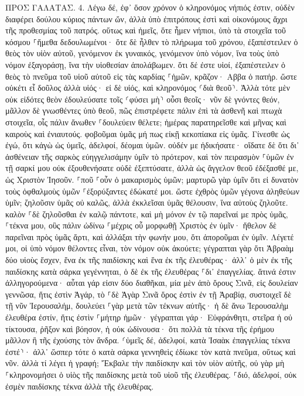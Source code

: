 \documentclass[twoside, 9pt]{extreport}
\begin{document}
ΠΡΟΣ ΓΑΛΑΤΑΣ.
4.
Λέγω δέ, ἐφ᾽ ὅσον χρόνον ὁ κληρονόμος νήπιός ἐστιν, οὐδὲν διαφέρει δούλου κύριος πάντων ὤν, 
ἀλλὰ ὑπὸ ἐπιτρόπους ἐστὶ καὶ οἰκονόμους ἄχρι τῆς προθεσμίας τοῦ πατρός. 
οὕτως καὶ ἡμεῖς, ὅτε ἦμεν νήπιοι, ὑπὸ τὰ στοιχεῖα τοῦ κόσμου ⸀ἤμεθα δεδουλωμένοι· 
ὅτε δὲ ἦλθεν τὸ πλήρωμα τοῦ χρόνου, ἐξαπέστειλεν ὁ θεὸς τὸν υἱὸν αὐτοῦ, γενόμενον ἐκ γυναικός, γενόμενον ὑπὸ νόμον, 
ἵνα τοὺς ὑπὸ νόμον ἐξαγοράσῃ, ἵνα τὴν υἱοθεσίαν ἀπολάβωμεν. 
ὅτι δέ ἐστε υἱοί, ἐξαπέστειλεν ὁ θεὸς τὸ πνεῦμα τοῦ υἱοῦ αὐτοῦ εἰς τὰς καρδίας ⸀ἡμῶν, κρᾶζον· Αββα ὁ πατήρ. 
ὥστε οὐκέτι εἶ δοῦλος ἀλλὰ υἱός· εἰ δὲ υἱός, καὶ κληρονόμος ⸂διὰ θεοῦ⸃. 
Ἀλλὰ τότε μὲν οὐκ εἰδότες θεὸν ἐδουλεύσατε τοῖς ⸂φύσει μὴ⸃ οὖσι θεοῖς· 
νῦν δὲ γνόντες θεόν, μᾶλλον δὲ γνωσθέντες ὑπὸ θεοῦ, πῶς ἐπιστρέφετε πάλιν ἐπὶ τὰ ἀσθενῆ καὶ πτωχὰ στοιχεῖα, οἷς πάλιν ἄνωθεν ⸀δουλεύειν θέλετε; 
ἡμέρας παρατηρεῖσθε καὶ μῆνας καὶ καιροὺς καὶ ἐνιαυτούς. 
φοβοῦμαι ὑμᾶς μή πως εἰκῇ κεκοπίακα εἰς ὑμᾶς. 
Γίνεσθε ὡς ἐγώ, ὅτι κἀγὼ ὡς ὑμεῖς, ἀδελφοί, δέομαι ὑμῶν. οὐδέν με ἠδικήσατε· 
οἴδατε δὲ ὅτι δι᾽ ἀσθένειαν τῆς σαρκὸς εὐηγγελισάμην ὑμῖν τὸ πρότερον, 
καὶ τὸν πειρασμὸν ⸀ὑμῶν ἐν τῇ σαρκί μου οὐκ ἐξουθενήσατε οὐδὲ ἐξεπτύσατε, ἀλλὰ ὡς ἄγγελον θεοῦ ἐδέξασθέ με, ὡς Χριστὸν Ἰησοῦν. 
⸀ποῦ ⸀οὖν ὁ μακαρισμὸς ὑμῶν; μαρτυρῶ γὰρ ὑμῖν ὅτι εἰ δυνατὸν τοὺς ὀφθαλμοὺς ὑμῶν ⸀ἐξορύξαντες ἐδώκατέ μοι. 
ὥστε ἐχθρὸς ὑμῶν γέγονα ἀληθεύων ὑμῖν; 
ζηλοῦσιν ὑμᾶς οὐ καλῶς, ἀλλὰ ἐκκλεῖσαι ὑμᾶς θέλουσιν, ἵνα αὐτοὺς ζηλοῦτε. 
καλὸν ⸀δὲ ζηλοῦσθαι ἐν καλῷ πάντοτε, καὶ μὴ μόνον ἐν τῷ παρεῖναί με πρὸς ὑμᾶς, 
⸀τέκνα μου, οὓς πάλιν ὠδίνω ⸀μέχρις οὗ μορφωθῇ Χριστὸς ἐν ὑμῖν· 
ἤθελον δὲ παρεῖναι πρὸς ὑμᾶς ἄρτι, καὶ ἀλλάξαι τὴν φωνήν μου, ὅτι ἀποροῦμαι ἐν ὑμῖν. 
Λέγετέ μοι, οἱ ὑπὸ νόμον θέλοντες εἶναι, τὸν νόμον οὐκ ἀκούετε; 
γέγραπται γὰρ ὅτι Ἀβραὰμ δύο υἱοὺς ἔσχεν, ἕνα ἐκ τῆς παιδίσκης καὶ ἕνα ἐκ τῆς ἐλευθέρας· 
ἀλλ᾽ ὁ μὲν ἐκ τῆς παιδίσκης κατὰ σάρκα γεγέννηται, ὁ δὲ ἐκ τῆς ἐλευθέρας ⸀δι᾽ ἐπαγγελίας. 
ἅτινά ἐστιν ἀλληγορούμενα· αὗται γάρ εἰσιν δύο διαθῆκαι, μία μὲν ἀπὸ ὄρους Σινᾶ, εἰς δουλείαν γεννῶσα, ἥτις ἐστὶν Ἁγάρ, 
τὸ ⸀δὲ Ἁγὰρ Σινᾶ ὄρος ἐστὶν ἐν τῇ Ἀραβίᾳ, συστοιχεῖ δὲ τῇ νῦν Ἰερουσαλήμ, δουλεύει ⸀γὰρ μετὰ τῶν τέκνων αὐτῆς· 
ἡ δὲ ἄνω Ἰερουσαλὴμ ἐλευθέρα ἐστίν, ἥτις ἐστὶν ⸀μήτηρ ἡμῶν· 
γέγραπται γάρ· Εὐφράνθητι, στεῖρα ἡ οὐ τίκτουσα, ῥῆξον καὶ βόησον, ἡ οὐκ ὠδίνουσα· ὅτι πολλὰ τὰ τέκνα τῆς ἐρήμου μᾶλλον ἢ τῆς ἐχούσης τὸν ἄνδρα. 
⸂ὑμεῖς δέ, ἀδελφοί, κατὰ Ἰσαὰκ ἐπαγγελίας τέκνα ἐστέ⸃· 
ἀλλ᾽ ὥσπερ τότε ὁ κατὰ σάρκα γεννηθεὶς ἐδίωκε τὸν κατὰ πνεῦμα, οὕτως καὶ νῦν. 
ἀλλὰ τί λέγει ἡ γραφή; Ἔκβαλε τὴν παιδίσκην καὶ τὸν υἱὸν αὐτῆς, οὐ γὰρ μὴ ⸀κληρονομήσει ὁ υἱὸς τῆς παιδίσκης μετὰ τοῦ υἱοῦ τῆς ἐλευθέρας. 
⸀διό, ἀδελφοί, οὐκ ἐσμὲν παιδίσκης τέκνα ἀλλὰ τῆς ἐλευθέρας. 
\end{document}
